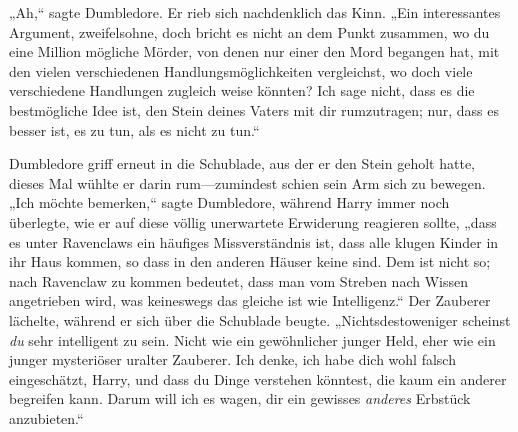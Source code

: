 „Ah,“ sagte Dumbledore. Er rieb sich nachdenklich das Kinn. „Ein interessantes Argument, zweifelsohne, doch bricht es nicht an dem Punkt zusammen, wo du eine Million mögliche Mörder, von denen nur einer den Mord begangen hat, mit den vielen verschiedenen Handlungsmöglichkeiten vergleichst, wo doch viele verschiedene Handlungen zugleich weise könnten? Ich sage nicht, dass es die bestmögliche Idee ist, den Stein deines Vaters mit dir rumzutragen; nur, dass es besser ist, es zu tun, als es nicht zu tun.“

Dumbledore griff erneut in die Schublade, aus der er den Stein geholt hatte, dieses Mal wühlte er darin rum—zumindest schien sein Arm sich zu bewegen. „Ich möchte bemerken,“ sagte Dumbledore, während Harry immer noch überlegte, wie er auf diese völlig unerwartete Erwiderung reagieren sollte, „dass es unter Ravenclaws ein häufiges Missverständnis ist, dass alle klugen Kinder in ihr Haus kommen, so dass in den anderen Häuser keine sind. Dem ist nicht so; nach Ravenclaw zu kommen bedeutet, dass man vom Streben nach Wissen angetrieben wird, was keineswegs das gleiche ist wie Intelligenz.“ Der Zauberer lächelte, während er sich über die Schublade beugte. „Nichtsdestoweniger scheinst \emph{du} sehr intelligent zu sein. Nicht wie ein gewöhnlicher junger Held, eher wie ein junger mysteriöser uralter Zauberer. Ich denke, ich habe dich wohl falsch eingeschätzt, Harry, und dass du Dinge verstehen könntest, die kaum ein anderer begreifen kann. Darum will ich es wagen, dir ein gewisses \emph{anderes} Erbstück anzubieten.“

